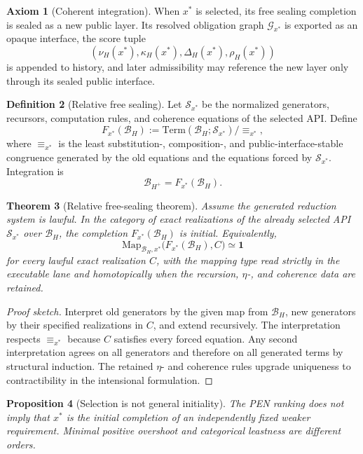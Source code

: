 \documentclass[11pt]{article}
\theoremstyle{plain}
\newtheorem{theorem}{Theorem}[section]
\newtheorem{proposition}[theorem]{Proposition}
\theoremstyle{definition}
\newtheorem{definition}[theorem]{Definition}
\newtheorem{axiom}[theorem]{Axiom}
\theoremstyle{remark}
\newenvironment{proofsketch}{\begin{proof}[Proof sketch]}{\end{proof}}
\newcommand{\B}{\mathcal{B}}
\begin{document}
\begin{axiom}[Coherent integration]
When \(x^*\) is selected, its free sealing completion is sealed as a new public layer. Its resolved obligation graph \(\mathcal{G}_{x^*}\) is exported as an opaque interface, the score tuple
\[
(\nu_H(x^*),\kappa_H(x^*),\Delta_H(x^*),\rho_H(x^*))
\]
is appended to history, and later admissibility may reference the new layer only through its sealed public interface.
\end{axiom}

\begin{definition}[Relative free sealing]
Let \(\mathcal S_{x^*}\) be the normalized generators, recursors, computation rules, and coherence equations of the selected API. Define
\[
F_{x^*}(\B_H)
:=
\mathrm{Term}(\B_H;\mathcal S_{x^*})/{\equiv_{x^*}},
\]
where \(\equiv_{x^*}\) is the least substitution-, composition-, and public-interface-stable congruence generated by the old equations and the equations forced by \(\mathcal S_{x^*}\). Integration is
\[
\B_{H^+}=F_{x^*}(\B_H).
\]
\end{definition}

\begin{theorem}[Relative free-sealing theorem]
Assume the generated reduction system is lawful. In the category of exact realizations of the already selected API \(\mathcal S_{x^*}\) over \(\B_H\), the completion \(F_{x^*}(\B_H)\) is initial. Equivalently,
\[
\mathrm{Map}_{\B_H,x^*}
\bigl(F_{x^*}(\B_H),C\bigr)
\simeq\mathbf1
\]
for every lawful exact realization \(C\), with the mapping type read strictly in the executable lane and homotopically when the recursion, \(\eta\)-, and coherence data are retained.
\end{theorem}

\begin{proofsketch}
Interpret old generators by the given map from \(\B_H\), new generators by their specified realizations in \(C\), and extend recursively. The interpretation respects \(\equiv_{x^*}\) because \(C\) satisfies every forced equation. Any second interpretation agrees on all generators and therefore on all generated terms by structural induction. The retained \(\eta\)- and coherence rules upgrade uniqueness to contractibility in the intensional formulation.
\end{proofsketch}

\begin{proposition}[Selection is not general initiality]
The PEN ranking does not imply that \(x^*\) is the initial completion of an independently fixed weaker requirement. Minimal positive overshoot and categorical leastness are different orders.
\end{proposition}
\end{document}
